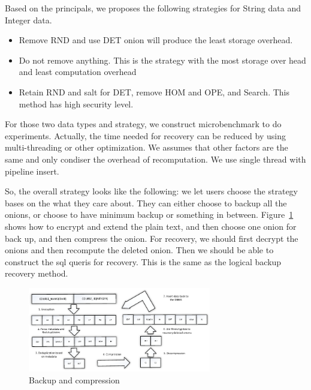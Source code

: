 Based on the principals, we proposes the following strategies for String data and Integer data. 

\begin{itemize}
\item Remove RND and use DET onion will produce the least storage overhead.
\item Do not remove anything. This is the strategy with the most storage over head and least computation overhead
\item Retain RND and salt for DET, remove HOM and OPE, and Search. This method has high security level.
\end{itemize}




For those two data types and strategy, we construct microbenchmark to do experiments. Actually, the time needed for recovery can be reduced by using multi-threading or other optimization. We assumes that other factors are the same and only condiser the overhead of recomputation. We use single thread with pipeline insert.

So, the overall strategy looks like the following: we let users choose the strategy bases on the what they care about. They can either choose to backup all the onions, or choose to have minimum backup or something in between. Figure~\ref{fig:stack7} shows how to encrypt and extend the plain text, and then choose one onion for back up, and then compress the onion. For recovery, we should first decrypt the onions and then recompute the deleted onion. Then we should be able to construct the sql queris for recovery. This is the same as the logical backup recovery method.

\begin{figure}[tb]
\centering
\includegraphics[width=8cm]{images/backup_and_recovery.pdf}
\caption{Backup and compression}
\label{fig:stack7}
\end{figure}



